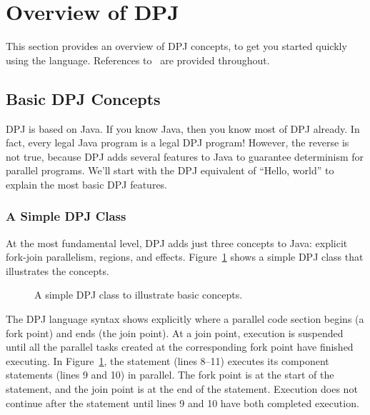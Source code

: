 \section{Overview of DPJ%
\label{sec:overview}}

This section provides an overview of DPJ concepts, to get you started
quickly using the language.  References to \ are provided
throughout.

\subsection{Basic DPJ Concepts%
\label{sec:overview:basic}}

DPJ is based on Java.  If you know Java, then you know most of DPJ
already.  In fact, every legal Java program is a legal DPJ program!
However, the reverse is not true, because DPJ adds several features to
Java to guarantee determinism for parallel programs.  We'll start with
the DPJ equivalent of ``Hello, world'' to explain the most basic DPJ
features.

\subsubsection{A Simple DPJ  Class%
\label{sec:overview:basic:simple}}

At the most fundamental level, DPJ adds just three concepts to Java:
explicit fork-join parallelism, regions, and effects.
Figure~\ref{fig:overview} shows a simple DPJ class  that
illustrates the concepts.

\begin{figure}

\caption{A simple DPJ class to illustrate basic concepts.}
\label{fig:overview}
\end{figure}

 The DPJ language syntax shows
explicitly where a parallel code section begins (a fork point) and
ends (the join point).  At a join point, execution is suspended until
all the parallel tasks created at the corresponding fork point have
finished executing.  In Figure~\ref{fig:overview}, the 
statement (lines 8--11) executes its component statements (lines 9 and
10) in parallel.  The fork point is at the start of the 
statement, and the join point is at the end of the statement.
Execution does not continue after the  statement until
lines 9 and 10 have both completed execution.

